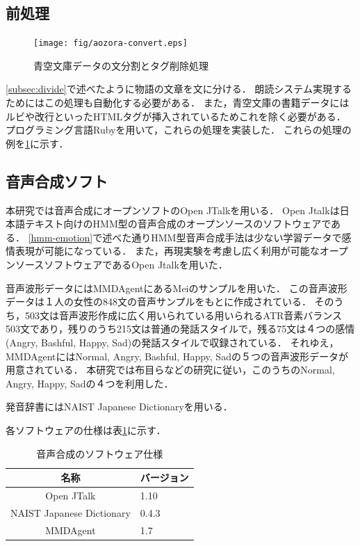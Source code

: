 \subsection{前処理}

\begin{figure}[hb]
  \begin{center}
    \texttt{[image: fig/aozora-convert.eps]}
    \caption{青空文庫データの文分割とタグ削除処理}
    \label{fig:aozora-convert}
  \end{center}
\end{figure}


\ref{subsec:divide}で述べたように物語の文章を文に分ける．
朗読システム実現するためにはこの処理も自動化する必要がある．
また，青空文庫の書籍データにはルビや改行といったHTMLタグが挿入されているためこれを除く必要がある．
プログラミング言語Ruby\cite{ruby}を用いて，これらの処理を実装した．
これらの処理の例を\ref{fig:aozora-convert}に示す．

\subsection{音声合成ソフト}
本研究では音声合成にオープンソフトのOpen JTalk\cite{jtalk}を用いる．
Open Jtalkは日本語テキスト向けのHMM型の音声合成のオープンソースのソフトウェアである．
\ref{hmm-emotion}で述べた通りHMM型音声合成手法は少ない学習データで感情表現が可能になっている．
また，再現実験を考慮し広く利用が可能なオープンソースソフトウェアであるOpen Jtalkを用いた．



音声波形データにはMMDAgent\cite{mei}にあるMeiのサンプルを用いた．
この音声波形データは１人の女性の848文の音声サンプルをもとに作成されている．
そのうち，503文は音声波形作成に広く用いられている用いられるATR音素バランス503文\cite{atr}であり，残りのうち215文は普通の発話スタイルで，残る75文は４つの感情(Angry, Bashful, Happy, Sad)の発話スタイルで収録されている．
それゆえ，MMDAgentにはNormal, Angry, Bashful, Happy, Sadの５つの音声波形データが用意されている．
本研究では布目ら\cite{fume}などの研究に従い，このうちのNormal, Angry, Happy, Sadの４つを利用した．


発音辞書にはNAIST Japanese Dictionary\cite{naist}を用いる．

各ソフトウェアの仕様は表\ref{voice-software}に示す．
\begin{table}[ht]
  \begin{center}
  \caption{音声合成のソフトウェア仕様}
  \label{voice-software}
  \begin{tabular}{|c|l|}
    \hline
    名称 & バージョン \\ \hline \hline
    Open JTalk & 1.10 \\ \hline
    NAIST Japanese Dictionary & 0.4.3  \\ \hline
    MMDAgent & 1.7 \\ \hline
  \end{tabular}
  \end{center}
\end{table}

